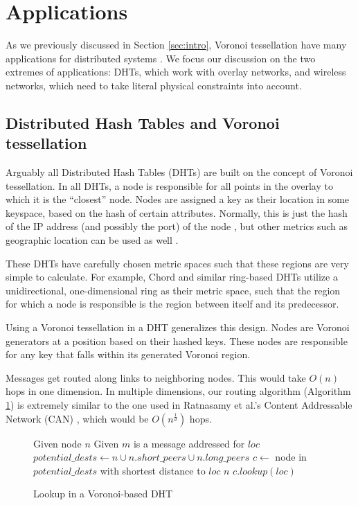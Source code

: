 \section{Applications}
\label{sec:applications}

As we previously discussed in Section \ref{sec:intro}, Voronoi tessellation have many applications for distributed systems \cite{carbunar2004distributed} \cite{hu2004scalable} \cite{hu2008voronoi} \cite{Backhaus:2007:VAS:1326257.1326266}.
We focus our discussion on the two extremes of applications: DHTs, which work with overlay networks, and wireless networks, which need to take literal physical constraints into account.




\subsection{Distributed Hash Tables and Voronoi tessellation}
Arguably all Distributed Hash Tables (DHTs) are built on the concept of Voronoi tessellation.
In all DHTs, a node is responsible for all points in the overlay to which it is the ``closest'' node.
Nodes are assigned a key as their location in some keyspace, based on the hash of certain attributes.
Normally, this is just the hash of the IP address (and possibly the port) of the node \cite{chord} \cite{kademlia} \cite{can} \cite{pastry}, but other metrics such as geographic location can be used as well \cite{ratnasamy2002ght}.

These DHTs have carefully chosen metric spaces such that these regions are very simple to calculate.
For example, Chord \cite{chord} and similar ring-based DHTs \cite{manku2003symphony} utilize a unidirectional, one-dimensional ring as their metric space, such that the region for which a node is responsible is the region between itself and its predecessor.

Using a Voronoi tessellation in a DHT generalizes this design. 
Nodes are Voronoi generators at a position based on their hashed keys.
These nodes are responsible for any key that falls within its generated Voronoi region.

Messages get routed along links to neighboring nodes. 
This would take $O(n)$ hops in one dimension.
In multiple dimensions, our routing algorithm (Algorithm \ref{alg:lookup}) is extremely similar to the one used in Ratnasamy et al.'s Content Addressable Network (CAN) \cite{can}, which would be $O(n^{\frac{1}{d}})$ hops.
\begin{figure}
	\caption{Lookup in a Voronoi-based DHT}
	\label{alg:lookup}
	\begin{algorithmic}[1] 
		\State Given node $n$
		\State Given $m$ is a message addressed for $loc$
		\State $potential\_dests \leftarrow n \cup n.short\_peers \cup n.long\_peers$
		\State $c \leftarrow $ node in $ potential\_dests$ with shortest distance to $loc$
		\Return $n$
		\Else
		\Return $c.lookup(loc)$
		\EndIf
	\end{algorithmic}
\end{figure}

